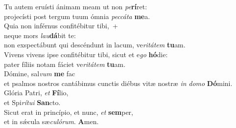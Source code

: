 \evenverse Tu autem eruísti ánimam meam ut non \textit{pe}\textbf{rí}ret:~\*\\
\evenverse projecísti post tergum tuum ómnia \textit{pec}\textit{cá}\textit{ta} \textbf{me}a.\\
\oddverse Quia non inférnus confitébitur tibi,~+\\
\oddverse  neque mors \textit{lau}\textbf{dá}bit te:~\*\\
\oddverse non exspectábunt qui descéndunt in lacum, ve\textit{ri}\textit{tá}\textit{tem} \textbf{tu}am.\\
\evenverse Vivens vivens ipse confitébitur tibi, sicut et e\textit{go} \textbf{hó}die:~\*\\
\evenverse pater fíliis notam fáciet ve\textit{ri}\textit{tá}\textit{tem} \textbf{tu}am.\\
\oddverse Dómine, sal\textit{vum} \textbf{me} fac~\*\\
\oddverse et psalmos nostros cantábimus cunctis diébus vitæ nostræ \textit{in} \textit{do}\textit{mo} \textbf{Dó}mini.\\
\evenverse Glória Patri, \textit{et} \textbf{Fí}lio,~\*\\
\evenverse et Spi\textit{rí}\textit{tu}\textit{i} \textbf{San}cto.\\
\oddverse Sicut erat in princípio, et nunc, \textit{et} \textbf{sem}per,~\*\\
\oddverse et in sǽcula sæ\textit{cu}\textit{ló}\textit{rum}. \textbf{A}men.\\
